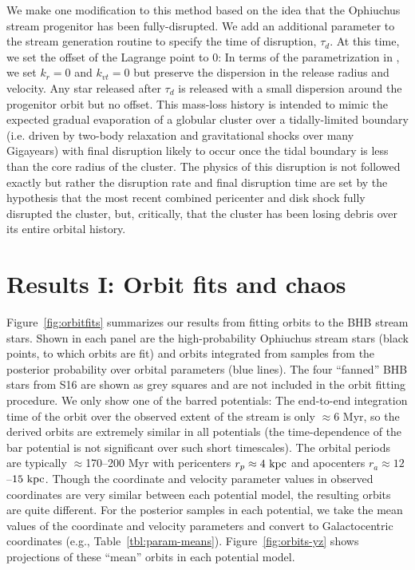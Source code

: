 We make one modification to this method based on the idea that the Ophiuchus stream progenitor has been fully-disrupted. We add an additional parameter to the stream generation routine to specify the time of disruption, $\tau_d$. At this time, we set the offset of the Lagrange point to 0: In terms of the parametrization in \citep{fardal14}, we set $k_r = 0$ and $k_{vt}=0$ but preserve the dispersion in the release radius and velocity. Any star released after $\tau_d$ is released with a small dispersion around the progenitor orbit but no offset. This mass-loss history is intended to mimic the expected gradual evaporation of a globular cluster over a tidally-limited boundary (i.e. driven by two-body relaxation and gravitational shocks over many Gigayears) with final disruption likely to occur once the tidal boundary is less than the core radius of the cluster. The physics of this disruption is not followed exactly but rather the disruption rate and final disruption time are set by the hypothesis that the most recent combined pericenter and disk shock fully disrupted the cluster, but, critically, that the cluster has been losing debris over its entire orbital history.

\section{Results I: Orbit fits and chaos}\label{sec:results1}

Figure~\ref{fig:orbitfits} summarizes our results from fitting orbits to the BHB stream stars. Shown in each panel are the high-probability Ophiuchus stream stars (black points, to which orbits are fit) and orbits integrated from samples from the posterior probability over orbital parameters (blue lines). The four ``fanned'' BHB stars from S16 are shown as grey squares and are not included in the orbit fitting procedure. We only show one of the barred potentials: The end-to-end integration time of the orbit over the observed extent of the stream is only $\approx$6 Myr, so the derived orbits are extremely similar in all potentials (the time-dependence of the bar potential is not significant over such short timescales). The orbital periods are typically $\approx$170--200 Myr with pericenters $r_p \approx 4~{\rm kpc}$ and apocenters $r_a \approx 12$--$15~{\rm kpc}$. Though the coordinate and velocity parameter values in observed coordinates are very similar between each potential model, the resulting orbits are quite different. For the posterior samples in each potential, we take the mean values of the coordinate and velocity parameters and convert to Galactocentric coordinates (e.g., Table~\ref{tbl:param-means}). Figure~\ref{fig:orbits-yz} shows projections of these ``mean'' orbits in each potential model.

